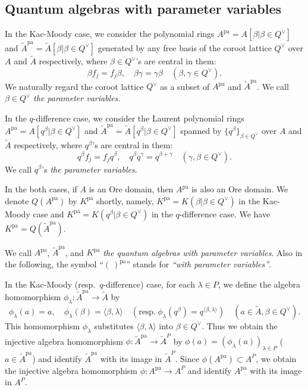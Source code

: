 \documentclass[12pt,twoside]{article}
\newcommand\bra{\langle}
\newcommand\ket{\rangle}
\newcommand\Qv{Q^\vee}
\newcommand\tA{{\widetilde A}}
\newcommand\pa{{\mathrm{pa}}}
\theoremstyle{plain} %
\theoremstyle{definition} %
\theoremstyle{definition} %
\numberwithin{theorem}{section}
\numberwithin{equation}{section}
\numberwithin{figure}{section}
\numberwithin{table}{section}
\begin{document}

\subsection{Quantum algebras with parameter variables}
\label{sec:A^pa}

In the Kac-Moody case, we consider
the polynomial rings 
$A^\pa=A[\beta|\beta\in\Qv]$ and $\tA^\pa=\tA[\beta|\beta\in\Qv]$
generated by any free basis of the coroot lattice $\Qv$ over $A$ and $\tA$ respectively,
where $\beta\in\Qv$'s are central in them:
\begin{equation*}
 \beta f_j = f_j \beta, \quad
 \beta\gamma = \gamma\beta \quad
 (\beta,\gamma\in\Qv).
\end{equation*}
We naturally regard the coroot lattice $\Qv$ 
as a subset of $A^\pa$ and $\tA^\pa$.
We call $\beta\in\Qv$ {\em the parameter variables}.

In the $q$-difference case, we consider
the Laurent polynomial rings 
$A^\pa=A[q^\beta|\beta\in\Qv]$ and
$\tA^\pa=\tA[q^\beta|\beta\in\Qv]$
spanned by $\{q^\beta\}_{\beta\in\Qv}$ 
over $A$ and $\tA$ respectively,
where $q^\beta$'s are central in them:
\begin{equation*}
 q^\beta f_j = f_j q^\beta, \quad
 q^\beta q^\gamma = q^{\beta+\gamma} \quad
 (\gamma,\beta\in\Qv).
\end{equation*}
We call $q^\beta$'s {\em the parameter variables}.

In the both cases, if $A$ is an Ore domain, 
then $A^\pa$ is also an Ore domain.
We denote $Q(A^\pa)$ by $K^\pa$ shortly, 
namely, $K^\pa=K(\beta|\beta\in\Qv)$ in the Kac-Moody case
and $K^\pa=K(q^\beta|\beta\in\Qv)$ in the $q$-difference case.
We have $K^\pa=Q(\tA^\pa)$.

We call $A^\pa$, $\tA^\pa$, and $K^\pa$ 
{\em the quantum algebras with parameter variables}.
Also in the following, 
the symbol ``$(\ )^\pa$'' stands for {\em ``with parameter variables''}.

In the Kac-Moody (resp.\ $q$-difference) case,
for each $\lambda\in P$, we define the algebra homomorphism 
$\phi_\lambda:\tA^\pa\to\tA$ by
\begin{equation*}
 \phi_\lambda(a)=a, \quad
 \phi_\lambda(\beta) = \bra\beta,\lambda\ket \quad
 (\text{resp.}\ \phi_\lambda(q^\beta) = q^{\bra\beta,\lambda\ket}) \quad
 (a\in\tA, \beta\in\Qv).
\end{equation*}
This homomorphism $\phi_\lambda$ 
substitutes $\bra\beta,\lambda\ket$ into $\beta\in\Qv$.
Thus we obtain the injective algebra homomorphism 
$\phi:\tA^\pa\to\tA^P$ by $\phi(a)=(\phi_\lambda(a))_{\lambda\in P}$
($a\in\tA^\pa$) and identify $\tA^\pa$ with its image in $\tA^P$.
Since $\phi(A^\pa)\subset A^P$, we obtain the injective algebra
homomorphism $\phi:A^\pa\to A^P$
and identify $A^\pa$ with its image in $A^P$.
\end{document}
